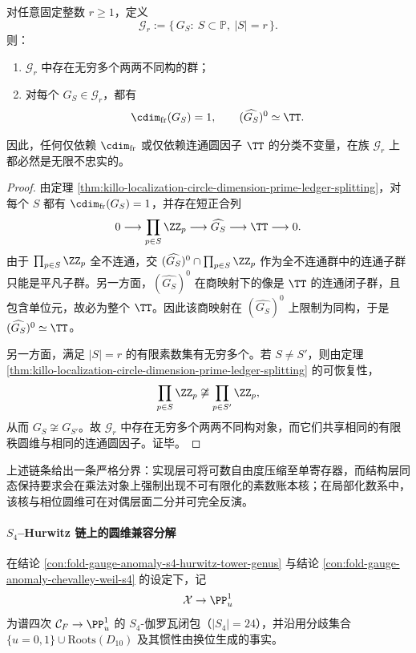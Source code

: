 \begin{corollary}[固定素数基数的局部化族在圆维口径下不可分类]\label{cor:killo-localization-fixed-cardinality-nonclassification}
对任意固定整数 \(r\ge 1\)，定义
\[
\mathscr G_r:=\{\,G_S:\ S\subset\mathbb P,\ |S|=r\,\}.
\]
则：
\begin{enumerate}
  \item \(\mathscr G_r\) 中存在无穷多个两两不同构的群；
  \item 对每个 \(G_S\in \mathscr G_r\)，都有
  \[
  \cdim_{\mathrm{fr}}(G_S)=1,
  \qquad
  (\widehat{G_S})^0\simeq \TT.
  \]
\end{enumerate}
因此，任何仅依赖 \(\cdim_{\mathrm{fr}}\) 或仅依赖连通圆因子 \(\TT\) 的分类不变量，在族 \(\mathscr G_r\) 上都必然是无限不忠实的。
\end{corollary}
\begin{proof}
由定理 \ref{thm:killo-localization-circle-dimension-prime-ledger-splitting}，对每个 \(S\) 都有 \(\cdim_{\mathrm{fr}}(G_S)=1\)，并存在短正合列
\[
0\longrightarrow \prod_{p\in S}\ZZ_p\longrightarrow \widehat{G_S}\longrightarrow \TT\longrightarrow 0.
\]
由于 \(\prod_{p\in S}\ZZ_p\) 全不连通，交
\(
(\widehat{G_S})^0\cap \prod_{p\in S}\ZZ_p
\)
作为全不连通群中的连通子群只能是平凡子群。另一方面，\((\widehat{G_S})^0\) 在商映射下的像是 \(\TT\) 的连通闭子群，且包含单位元，故必为整个 \(\TT\)。因此该商映射在 \((\widehat{G_S})^0\) 上限制为同构，于是
\(
(\widehat{G_S})^0\simeq \TT
\)。

另一方面，满足 \(|S|=r\) 的有限素数集有无穷多个。若 \(S\neq S'\)，则由定理 \ref{thm:killo-localization-circle-dimension-prime-ledger-splitting} 的可恢复性，
\[
\prod_{p\in S}\ZZ_p\not\cong \prod_{p\in S'}\ZZ_p,
\]
从而 \(G_S\not\cong G_{S'}\)。故 \(\mathscr G_r\) 中存在无穷多个两两不同构对象，而它们共享相同的有限秩圆维与相同的连通圆因子。证毕。
\end{proof}

上述链条给出一条严格分界：实现层可将可数自由度压缩至单寄存器，而结构层同态保持要求会在乘法对象上强制出现不可有限化的素数账本核；在局部化数系中，该核与相位圆维可在对偶层面二分并可完全反演。

\paragraph{\texorpdfstring{$S_4$}{S4}--Hurwitz 链上的圆维兼容分解}
在结论 \ref{con:fold-gauge-anomaly-s4-hurwitz-tower-genus} 与结论 \ref{con:fold-gauge-anomaly-chevalley-weil-s4} 的设定下，记
\[
\mathcal X\to \PP^1_u
\]
为谱四次 \(\mathcal C_F\to \PP^1_u\) 的 \(S_4\)-伽罗瓦闭包（\(|S_4|=24\)），并沿用分歧集合
\(
\{u=0,1\}\cup\mathrm{Roots}(D_{10})
\)
及其惯性由换位生成的事实。

